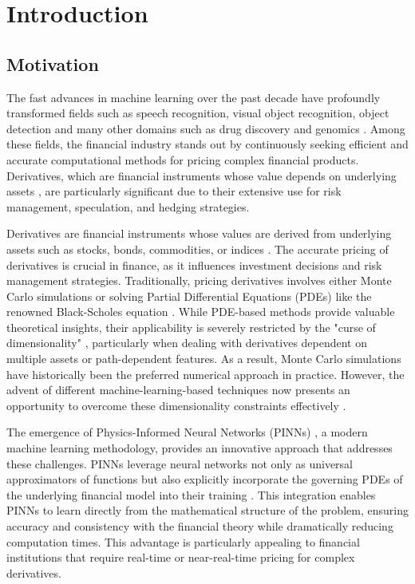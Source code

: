 \documentclass[12pt]{report} %
\theoremstyle{plain}           %
\theoremstyle{definition}      %
\theoremstyle{remark}          %
\begin{document}
\chapter{Introduction}

\section{Motivation}

The fast advances in machine learning over the past decade have profoundly transformed 
fields such as speech recognition, visual object recognition, object detection and many other domains such 
as drug discovery and genomics \cite{lecun}. Among these fields, the financial industry stands out by continuously 
seeking efficient and accurate computational methods for pricing complex financial products. Derivatives, 
which are financial instruments whose value depends on underlying assets \cite{alma99148840908702021}, are particularly 
significant due to their extensive use for risk management, speculation, and hedging  
strategies.

Derivatives are financial instruments whose values are derived from underlying assets such 
as stocks, bonds, commodities, or indices \cite{Wilmott2010PaulWO}. The accurate pricing of derivatives is crucial in 
finance, as it influences investment decisions and risk management strategies. Traditionally, 
pricing derivatives involves either Monte Carlo simulations \cite{glasserman2004monte} or solving Partial Differential 
Equations (PDEs) like the renowned Black-Scholes equation \cite{blackscholes}. While PDE-based methods provide 
valuable theoretical insights, their applicability is severely restricted by the "curse of 
dimensionality" \cite{bellman1966dynamic}, particularly when dealing with derivatives dependent on multiple assets or 
path-dependent features. As a result, Monte Carlo simulations have historically been the 
preferred numerical approach in practice. However, the advent of different 
machine-learning-based techniques now presents an opportunity to overcome these 
dimensionality constraints effectively \cite{Han_2018}.

The emergence of Physics-Informed Neural Networks (PINNs) \cite{RAISSI2019686}, a modern machine learning 
methodology, provides an innovative approach that addresses these challenges. PINNs leverage 
neural networks not only as universal approximators of functions but also explicitly 
incorporate the governing PDEs \cite{RAISSI2019686} of the underlying financial model into their training . This 
integration enables PINNs to learn directly from the mathematical structure of the problem, 
ensuring accuracy and consistency with the financial theory while dramatically reducing 
computation times. This advantage is particularly appealing to financial institutions that 
require real-time or near-real-time pricing for complex derivatives.
\end{document}

